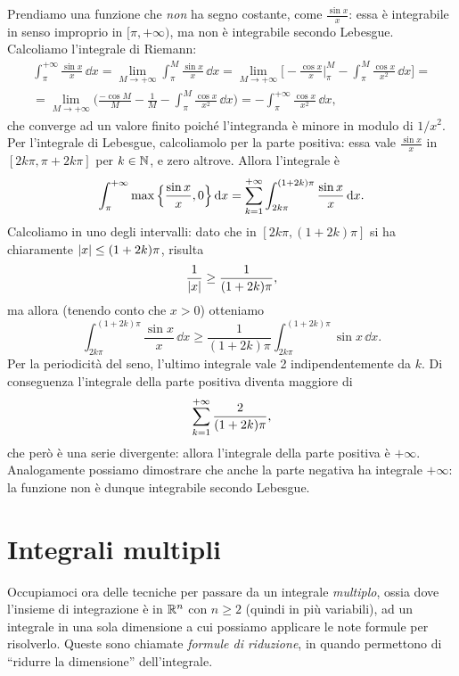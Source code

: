 Prendiamo una funzione che \emph{non} ha segno costante, come $\frac{\sin x}{x}$: essa è integrabile in senso improprio in $[\pi,+\infty)$, ma non è integrabile secondo Lebesgue.
Calcoliamo l'integrale di Riemann:
\begin{multline}
	\int_\pi^{+\infty}\frac{\sin x}{x}\,\dd x=\lim_{M\to+\infty}\int_\pi^M\frac{\sin x}{x}\,\dd x=\lim_{M\to+\infty}\bigg[-\frac{\cos x}{x}\Big|_\pi^M-\int_\pi^M\frac{\cos x}{x^2}\,\dd x\bigg]=\\
	=\lim_{M\to+\infty}\bigg(\frac{-\cos M}{M}-\frac1{M}-\int_\pi^M\frac{\cos x}{x^2}\,\dd x\bigg)=-\int_\pi^{+\infty}\frac{\cos x}{x^2}\,\dd x,
\end{multline}
che converge ad un valore finito poich\'e l'integranda è minore in modulo di $1/x^2$.
Per l'integrale di Lebesgue, calcoliamolo per la parte positiva: essa vale $\frac{\sin x}{x}$ in $[2k\pi,\pi+2k\pi]$ per $k\in\mathbb{N}$, e zero altrove. 
Allora l'integrale è
\begin{equation}
	\int_\pi^{+\infty}\max\Big\{\frac{\sin x}{x},0\Big\}\,\textup{d} x=\sum_{{k}=1}^{+\infty}\int_{2k\pi}^{(1+2k)\pi}\frac{\sin x}{x}\,\textup{d} x.
\end{equation}
Calcoliamo in uno degli intervalli: dato che in $[2k\pi,(1+2k)\pi]$ si ha chiaramente $\left|{x}\right|\leq(1+2k)\pi$, risulta
\begin{equation*}
	\frac1{\left|{x}\right|}\geq\frac1{(1+2k)\pi},
\end{equation*}
ma allora (tenendo conto che $x>0$) otteniamo
\begin{equation}
	\int_{2k\pi}^{(1+2k)\pi}\frac{\sin x}{x}\,\dd x\geq\frac1{(1+2k)\pi}\int_{2k\pi}^{(1+2k)\pi}\sin x\,\dd x.
\end{equation}
Per la periodicità del seno, l'ultimo integrale vale 2 indipendentemente da $k$.
Di conseguenza l'integrale della parte positiva diventa maggiore di
\begin{equation*}
	\sum_{{k}=1}^{+\infty}\frac2{(1+2k)\pi},
\end{equation*}
che però è una serie divergente: allora l'integrale della parte positiva è $+\infty$.
Analogamente possiamo dimostrare che anche la parte negativa ha integrale $+\infty$: la funzione non è dunque integrabile secondo Lebesgue.

\section{Integrali multipli}
Occupiamoci ora delle tecniche per passare da un integrale \emph{multiplo}, ossia dove l'insieme di integrazione è in $\mathbb{R}^n$ con $n\geq 2$ (quindi in più variabili), ad un integrale in una sola dimensione a cui possiamo applicare le note formule per risolverlo.
Queste sono chiamate \emph{formule di riduzione}, in quando permettono di ``ridurre la dimensione'' dell'integrale.


